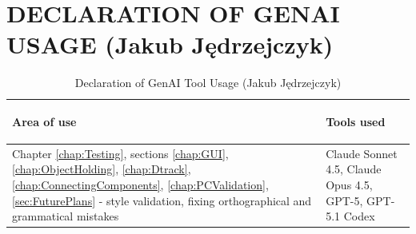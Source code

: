 \section{DECLARATION OF GENAI USAGE (Jakub Jędrzejczyk)}
\label{chap:genaiJJ}




\begin{table}[H]
\caption{Declaration of GenAI Tool Usage (Jakub Jędrzejczyk)}
\label{tab:genaiJJ}
\begin{center}

\begin{tabular}{|p{}|p{}|}
    \hline
    \begin{center}
       \textbf{Area of use}
   \end{center}
   & \begin{center}
       \textbf{Tools used}
   \end{center}
   \\ \hline
Chapter \ref{chap:Testing}, sections \ref{chap:GUI}, \ref{chap:ObjectHolding}, \ref{chap:Dtrack}, \ref{chap:ConnectingComponents}, \ref{chap:PCValidation}, \ref{sec:FuturePlans} - style validation, fixing orthographical and grammatical mistakes & Claude Sonnet 4.5, Claude Opus 4.5, GPT-5, GPT-5.1 Codex \\
\hline
\end{tabular}
\end{center}
\end{table}


